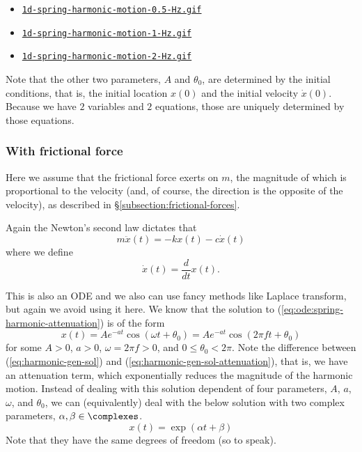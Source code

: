 \documentclass[12pt]{article}
\begin{document}
\begin{itemize}
\item
{\tt \href{https://github.com/sungheeyun/science/blob/main/animations/1d-spring-harmonic-motion-0.5-Hz.gif}{1d-spring-harmonic-motion-0.5-Hz.gif}}
\item
{\tt \href{https://github.com/sungheeyun/science/blob/main/animations/1d-spring-harmonic-motion-1-Hz.gif}{1d-spring-harmonic-motion-1-Hz.gif}}
\item
{\tt \href{https://github.com/sungheeyun/science/blob/main/animations/1d-spring-harmonic-motion-2-Hz.gif}{1d-spring-harmonic-motion-2-Hz.gif}}
\end{itemize}

Note that the other two parameters, $A$ and $\theta_0$, are determined by the initial conditions,
that is, the initial location $x(0)$ and the initial velocity $\dot{x}(0)$.
Because we have $2$ variables and $2$ equations,
those are uniquely determined by those equations.


\subsubsection{With frictional force}
\label{subsubsection:spring-with-frictional-force}

Here we assume that the frictional force exerts on $m$,
the magnitude of which is proportional to the velocity
(and, of course, the direction is the opposite of the velocity),
as described in \S\ref{subsection:frictional-forces}.

Again the Newton's second law dictates that
\begin{equation}
\label{eq:ode:spring-harmonic-attenuation}
	m \ddot{x}(t)
	=
	-kx(t) - c \dot{x}(t)
\end{equation}
where we define
\[
	\dot{x}(t) = \frac{d}{dt} x(t).
\]

This is also an ODE and we also can use fancy methods like Laplace transform, but again we avoid using it here.
We know that the solution to (\ref{eq:ode:spring-harmonic-attenuation})
is of the form
\begin{equation}
\label{eq:harmonic-gen-sol-attenuation}
	x(t) = A e^{-at} \cos(\omega t + \theta_0)
	= A e^{-at}\cos(2\pi f t + \theta_0)
\end{equation}
for some $A>0$, $a>0$, $\omega=2\pi f >0$, and $0\leq \theta_0 <2\pi$.
Note the difference between (\ref{eq:harmonic-gen-sol}) and (\ref{eq:harmonic-gen-sol-attenuation}),
that is,
we have an attenuation term,
which exponentially reduces the magnitude of the harmonic motion.
Instead of dealing with this solution dependent of four parameters, $A$, $a$, $\omega$, and $\theta_0$,
we can (equivalently) deal with the below solution with two complex parameters, $\alpha,\beta\in\complexes$.
\begin{equation}
\label{eq:harmonic-gen-sol-complex}
x(t) = \exp(\alpha t + \beta)
\end{equation}
Note that they have the same degrees of freedom (so to speak).
\end{document}
